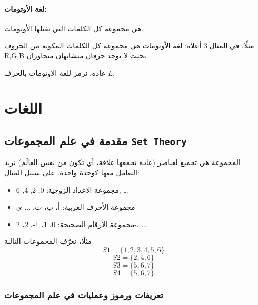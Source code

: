 \documentclass[12pt]{article}
\begin{document}
\paragraph{لغة الأوتومات: } هي مجموعة كل الكلمات التي يقبلها الأوتومات.

مثلًا، في المثال 3 أعلاه: لغة الأوتومات هي مجموعة كل الكلمات المكونة من الحروف R,G,B بحيث لا يوجد حرفان متشابهان متجاوران.

عادة، نرمز للغة الأوتومات بالحرف $L$.

\section{اللغات}

\subsection{مقدمة في علم المجموعات \textenglish{\texttt{Set Theory}}}

المجموعة هي تجميع لعناصر  (عادة تجمعها علاقة، أي تكون من نفس العالَم) نريد التعامل معها كوحدة واحدة. على سبيل المثال:
\begin{itemize}
    \item مجموعة الأعداد الزوجية: {0, 2, 4, 6, \ldots}
    \item مجموعة الأحرف العربية: {أ، ب، ت، ... ي}
    \item مجموعة الأرقام الصحيحة: {0، 1، 1-، 2، 2-، \ldots}
\end{itemize}

مثلًا، نعرّف المجموعات التالية
$$S1 = \{ 1, 2, 3, 4, 5, 6 \}$$
$$S2 = \{ 2, 4, 6 \}$$
$$S3 = \{ 5, 6, 7 \}$$
$$S4 = \{ 5, 6, 7 \}$$

\subsubsection{تعريفات ورموز وعمليات في علم المجموعات}
\end{document}
